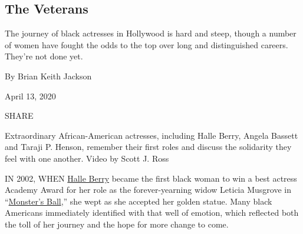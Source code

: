 \hypertarget{the-veterans}{%
\subsection{The Veterans}\label{the-veterans}}

The journey of black actresses in Hollywood is hard and steep, though a
number of women have fought the odds to the top over long and
distinguished careers. They're not done yet.

By Brian Keith Jackson

April 13, 2020

SHARE

Extraordinary African-American actresses, including Halle Berry, Angela
Bassett and Taraji P. Henson, remember their first roles and discuss the
solidarity they feel with one another. Video by Scott J. Ross

IN 2002, WHEN
\href{https://tmagazine.blogs.nytimes.com/2012/10/18/roles-of-a-lifetime-halle-berry/}{Halle
Berry} became the first black woman to win a best actress Academy Award
for her role as the forever-yearning widow Leticia Musgrove in
``\href{https://www.nytimes.com/watching/titles/movies/1000037537}{Monster's
Ball},'' she wept as she accepted her golden statue. Many black
Americans immediately identified with that well of emotion, which
reflected both the toll of her journey and the hope for more change to
come.

